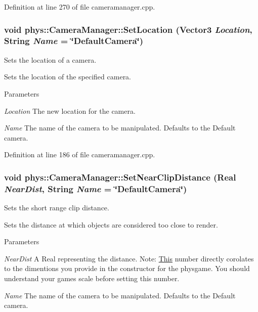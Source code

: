 Definition at line 270 of file cameramanager.cpp.

\hypertarget{classphys_1_1CameraManager_a3f1b48057ca2c1cd79f3e61c9fcbe1b4}{
\subsubsection[{SetLocation}]{\setlength{\rightskip}{0pt plus 5cm}void phys::CameraManager::SetLocation ({\bf Vector3} {\em Location}, \/  {\bf String} {\em Name} = {\ttfamily \char`\"{}DefaultCamera\char`\"{}})}}
\label{d9/d91/classphys_1_1CameraManager_a3f1b48057ca2c1cd79f3e61c9fcbe1b4}


Sets the location of a camera. 

Sets the location of the specified camera. 
\begin{DoxyParams}{Parameters}
\item[{\em Location}]The new location for the camera. \item[{\em Name}]The name of the camera to be manipulated. Defaults to the Default camera. \end{DoxyParams}


Definition at line 186 of file cameramanager.cpp.

\hypertarget{classphys_1_1CameraManager_ad639c275a2bb1c6c05a8800f8e8412c6}{
\subsubsection[{SetNearClipDistance}]{\setlength{\rightskip}{0pt plus 5cm}void phys::CameraManager::SetNearClipDistance ({\bf Real} {\em NearDist}, \/  {\bf String} {\em Name} = {\ttfamily \char`\"{}DefaultCamera\char`\"{}})}}
\label{d9/d91/classphys_1_1CameraManager_ad639c275a2bb1c6c05a8800f8e8412c6}


Sets the short range clip distance. 

Sets the distance at which objects are considered too close to render. 
\begin{DoxyParams}{Parameters}
\item[{\em NearDist}]A Real representing the distance. Note: \hyperlink{structThis}{This} number directly corolates to the dimentions you provide in the constructor for the physgame. You should understand your games scale before setting this number. \item[{\em Name}]The name of the camera to be manipulated. Defaults to the Default camera. \end{DoxyParams}


